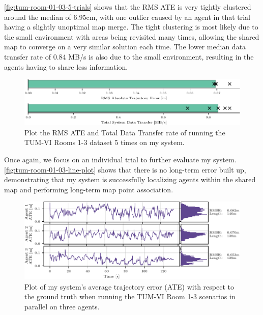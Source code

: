 \autoref{fig:tum-room-01-03-5-trials} shows that the RMS ATE is very tightly clustered around the median of 6.95cm, with one outlier caused by an agent in that trial having a slightly unoptimal map merge. The tight clustering is most likely due to the small environment with areas being revisited many times, allowing the shared map to converge on a very similar solution each time. The lower median data transfer rate of 0.84 MB/s is also due to the small environment, resulting in the agents having to share less information.

\begin{figure}[h]
    \centering
    \includegraphics[width=0.8\linewidth]{figures/comparison_apr11_tum_room_trajectory_a.pdf}

    \caption{Plot the RMS ATE and Total Data Transfer rate of running the TUM-VI Rooms 1-3 dataset 5 times on my system.}
    \label{fig:tum-room-01-03-5-trials}
\end{figure}

Once again, we focus on an individual trial to further evaluate my system. \autoref{fig:tum-room-01-03-line-plot} shows that there is no long-term error built up, demonstrating that my system is successfully localizing agents within the shared map and performing long-term map point association.

\begin{figure}[h]
    \centering
    \includegraphics[width=0.9\linewidth]{figures/apr11_tum_room_trajectory_a_line_plot.pdf}

    \caption{Plot of my system's average trajectory error (ATE) with respect to the ground truth when running the TUM-VI Room 1-3 scenarios in parallel on three agents.}
    \label{fig:tum-room-01-03-line-plot}
\end{figure}


